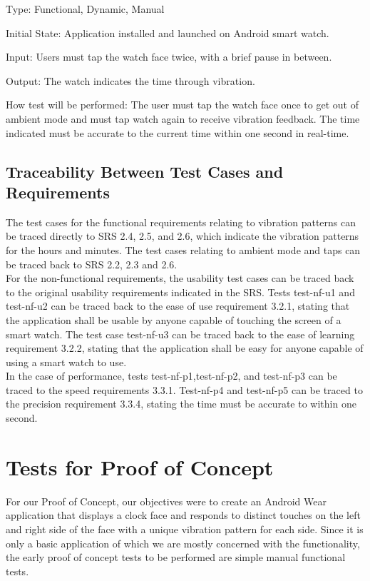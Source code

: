 \begin{enumerate}
Type: Functional, Dynamic, Manual
					
Initial State: Application installed and launched on Android smart watch. 
					
Input: Users must tap the watch face twice, with a brief pause in between.
					
Output: The watch indicates the time through vibration.
					
How test will be performed: The user must tap the watch face once to get out of ambient mode and must tap watch again to receive vibration feedback. The time indicated must be accurate to the current time within one second in real-time.


\end{enumerate}


\subsection{Traceability Between Test Cases and Requirements}
The test cases for the functional requirements relating to vibration patterns can be traced directly to SRS 2.4, 2.5, and 2.6, which indicate the vibration patterns for the hours and minutes. The test cases relating to ambient mode and taps can be traced back to SRS 2.2, 2.3 and 2.6. \\
\newline
For the non-functional requirements, the usability test cases can be traced back to the original usability requirements indicated in the SRS. Tests test-nf-u1 and test-nf-u2 can be traced back to the ease of use requirement 3.2.1, stating that the application shall be usable by anyone capable of touching the screen of a smart watch. The test case test-nf-u3 can be traced back to the ease of learning requirement 3.2.2, stating that the application shall be easy for anyone capable of using a smart watch to use. \\
\newline
In the case of performance, tests test-nf-p1,test-nf-p2, and test-nf-p3 can be traced to the speed requirements 3.3.1. Test-nf-p4 and test-nf-p5 can be traced to the precision requirement 3.3.4, stating the time must be accurate to within one second.

\section{Tests for Proof of Concept}
For our Proof of Concept, our objectives were to create an Android Wear application that displays a clock face and responds to distinct touches on the left and right side of the face with a unique vibration pattern for each side. Since it is only a basic application of which we are mostly concerned with the functionality, the early proof of concept tests to be performed are simple manual functional tests.
